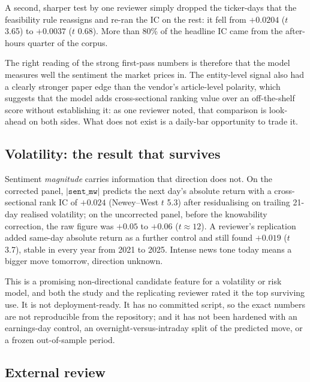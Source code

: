 \documentclass[11pt,letterpaper]{article}
\newcommand{\code}[1]{\texttt{#1}}
\begin{document}
A second, sharper test by one reviewer simply dropped the ticker-days that the feasibility rule
reassigns and re-ran the IC on the rest: it fell from $+0.0204$ ($t$ 3.65) to $+0.0037$
($t$ 0.68). More than 80\% of the headline IC came from the after-hours quarter of the corpus.

The right reading of the strong first-pass numbers is therefore that the model measures well the
sentiment the market prices in. The entity-level signal also had a clearly stronger paper edge
than the vendor's article-level polarity, which suggests that the model adds cross-sectional
ranking value over an off-the-shelf score without establishing it: as one reviewer noted, that
comparison is look-ahead on both sides. What does not exist is a daily-bar opportunity to
trade it.

\subsection{Volatility: the result that survives}

Sentiment \emph{magnitude} carries information that direction does not. On the corrected panel,
$|\code{sent\_mw}|$ predicts the next day's absolute return with a cross-sectional rank IC of
$+0.024$ (Newey--West $t$ 5.3) after residualising on trailing 21-day realised volatility; on the
uncorrected panel, before the knowability correction, the raw figure was $+0.05$ to $+0.06$
($t\approx12$). A reviewer's replication added same-day absolute return as a further control and
still found $+0.019$ ($t$ 3.7), stable in every year from 2021 to 2025. Intense news tone today
means a bigger move tomorrow, direction unknown.

This is a promising non-directional candidate feature for a volatility or risk model, and both
the study and the replicating reviewer rated it the top surviving use. It is not
deployment-ready. It has no committed script, so the exact numbers are not reproducible from the
repository; and it has not been hardened with an earnings-day control, an
overnight-versus-intraday split of the predicted move, or a frozen out-of-sample period.

\subsection{External review}
\end{document}
